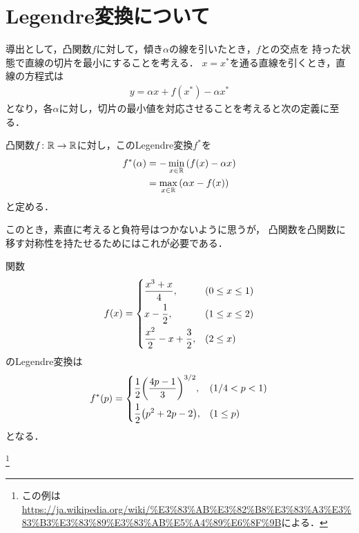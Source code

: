 \section{Legendre変換について}
導出として，凸関数$f$に対して，傾き$\alpha$の線を引いたとき，$f$との交点を
持った状態で直線の切片を最小にすることを考える．
$x =x^{*}$を通る直線を引くとき，直線の方程式は
\begin{align}
		y = \alpha x + f(x^{*}) - \alpha x^{*} 
\end{align}
となり，各$\alpha$に対し，切片の最小値を対応させることを考えると次の定義に至る．
\begin{defn}[Legendre変換]
		凸関数$f\colon\mathbb{R}\to\mathbb{R}$に対し，このLegendre変換$f^{*}$を
		\begin{align}
				f^{*}(\alpha) &= -\min_{x\in\mathbb{R}}\qty(f(x)-\alpha x)\\
				 &= \max_{x\in\mathbb{R}}\qty(\alpha x - f(x))\label{def_legendre}
		\end{align}
		と定める．
\end{defn}
このとき，素直に考えると負符号はつかないように思うが，
凸関数を凸関数に移す対称性を持たせるためにはこれが必要である．
\begin{eg}
		関数
		\begin{align}
				f(x)=
				\begin{dcases}
						\frac{x^3+x}{4} ,& (0\leq x \leq 1)\\
						x-\frac{1}{2} ,& (1 \leq x \leq 2)\\
						\frac{x^2}{2} - x + \frac{3}{2} ,& (2\leq x)
				\end{dcases}
		\end{align}
		のLegendre変換は
		\begin{align}
				f^{*}(p) = 
				\begin{dcases}
						\frac{1}{2}\qty(\frac{4p-1}{3})^{3/2} ,& (1/4 < p < 1)\\
						\frac{1}{2}\qty(p^2 + 2p - 2) ,& (1\leq p)
				\end{dcases}
		\end{align}
		となる．

		\footnote{この例は\url{https://ja.wikipedia.org/wiki/\%E3\%83\%AB\%E3\%82\%B8\%E3\%83\%A3\%E3\%83\%B3\%E3\%83\%89\%E3\%83\%AB\%E5\%A4\%89\%E6\%8F\%9B}による．}
\end{eg}

